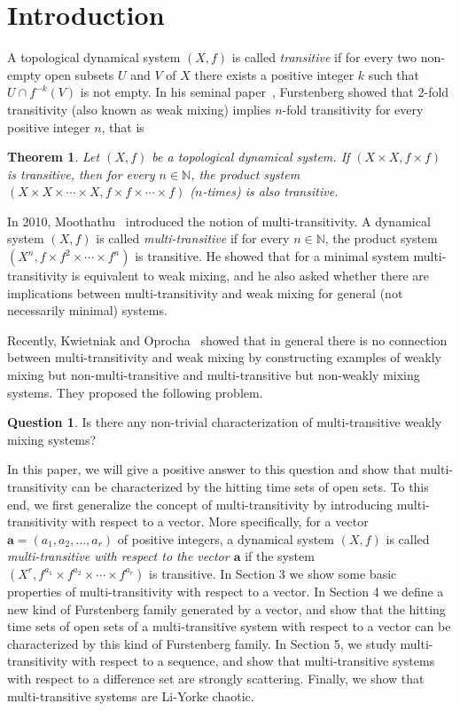 \documentclass[12pt,a4paper]{amsart}
\newtheorem{thm}{Theorem}[section]
\theoremstyle{definition}
\newtheorem{ques}{Question}
\numberwithin{equation}{section}
\begin{document}
\section{Introduction}
A topological dynamical system $(X,f)$ is called \emph{transitive}
if for every two non-empty open subsets $U$ and $V$ of $X$
there exists a positive integer $k$ such that $U\cap f^{-k}(V)$ is not empty.
In his seminal paper~\cite{Furstenberg-1967}, Furstenberg showed that $2$-fold transitivity
(also known as weak mixing) implies $n$-fold transitivity for every positive integer $n$, that is
\begin{thm}
Let $(X,f)$ be a topological dynamical system. If $(X\times X,f\times f)$ is transitive, then
for every $n\in\mathbb{N}$,
the product system $(X\times X\times\dotsb \times X, f\times f\times\dotsb \times f)$ ($n$-times) is also transitive.
\end{thm}
In 2010, Moothathu~\cite{Moothathu-2010} introduced the notion of multi-transitivity.
A dynamical system $(X,f)$ is called \emph{multi-transitive} if for every $n\in\mathbb{N}$,
the product system $(X^n,f\times f^2\times\dotsb\times f^n)$ is transitive.
He showed that for a minimal system multi-transitivity is equivalent to weak mixing, and
he also asked whether there are implications between multi-transitivity and weak mixing
for general (not necessarily minimal) systems.

Recently, Kwietniak and Oprocha~\cite{D-Kwietniak-P-Oprocha-2010} showed that in general
there is no connection between multi-transitivity and weak mixing
by constructing examples of weakly mixing but non-multi-transitive
and multi-transitive but non-weakly mixing systems. They proposed the following problem.

\begin{ques}
Is there any non-trivial characterization of multi-transitive weakly mixing systems?
\end{ques}

In this paper, we will give a positive answer to this question  and
show that multi-transitivity can be characterized by the hitting time sets of open sets.
To this end, we first generalize the concept of multi-transitivity
by introducing multi-transitivity with respect to a vector.
More specifically, for a vector $\mathbf{a}=(a_1,a_2,\dotsc,a_r)$ of positive integers,
a dynamical system $(X,f)$ is called \emph{multi-transitive with respect to the vector $\mathbf{a}$}
if the system  $(X^r,f^{a_1}\times f^{a_2}\times \dotsb \times f^{a_r})$  is transitive.
In Section 3 we show some basic properties of multi-transitivity with respect to a vector.
In Section 4 we define a new kind of Furstenberg family generated by a vector, and
show that the hitting time sets of open sets of a multi-transitive system with respect to a vector can be
characterized by this kind of Furstenberg family.
In Section 5, we study multi-transitivity with respect to a sequence, and show that
multi-transitive systems with respect to a difference set are strongly scattering.
Finally, we show that multi-transitive systems are  Li-Yorke chaotic.
\end{document}
